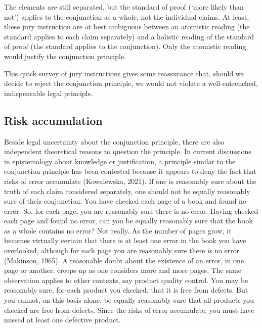 \documentclass[
  10pt,
  dvipsnames,enabledeprecatedfontcommands]{scrartcl}
\begin{document}
\noindent The elements are still separated, but the standard of proof
(`more likely than not') applies to the conjunction as a whole, not the
individual claims. At least, these jury instruction are at best
ambiguous between an atomistic reading (the standard applies to each
claim separately) and a holistic reading of the standard of proof (the
standard applies to the conjunction). Only the atomistic reading would
justify the conjunction principle.

This quick survey of jury instructions gives some reassurance that,
should we decide to reject the conjunction principle, we would not
violate a well-entrenched, indispensable legal
principle.

\hypertarget{risk-accumulation}{%
\subsection{Risk accumulation}\label{risk-accumulation}}

Beside legal uncertainty about the conjunction principle, there are also
independent theoretical reasons to question the principle. In current
discussions in epistemology about knowledge or justification, a
principle similar to the conjunction principle has been contested
because it appears to deny the fact that risks of error accumulate
(Kowalewska, 2021). If one is reasonably sure about the truth of each
claim considered separately, one should not be equally reasonably sure
of their conjunction. You have checked each page of a book and found no
error. So, for each page, you are reasonably sure there is no error.
Having checked each page and found no error, can you be equally
reasonably sure that the book as a whole contains no error? Not really.
As the number of pages grow, it becomes virtually certain that there is
at least one error in the book you have overlooked, although for each
page you are reasonably sure there is no error (Makinson, 1965). A
reasonable doubt about the existence of an error, in one page or
another, creeps up as one considers more and more pages. The same
observation applies to other contexts, say product quality control. You
may be reasonably sure, for each product you checked, that it is free
from defects. But you cannot, on this basis alone, be equally reasonably
sure that all products you checked are free from defects. Since the
risks of error accumulate, you must have missed at least one defective
product.
\end{document}
